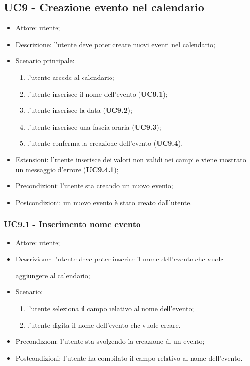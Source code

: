 

\subsection{UC9 - Creazione evento nel calendario}
\begin{itemize}
    \item Attore: utente;
    \item Descrizione: l'utente deve poter creare nuovi eventi nel calendario;
    \item Scenario principale:
        \begin{enumerate}
        \item l'utente accede al calendario;
        \item l'utente inserisce il nome dell'evento (\textbf{UC9.1});
        \item l'utente inserisce la data (\textbf{UC9.2});
        \item l'utente inserisce una fascia oraria (\textbf{UC9.3});
        \item l'utente conferma la creazione dell'evento (\textbf{UC9.4}).
        \end{enumerate}
    \item Estensioni: l'utente inserisce dei valori non validi nei campi e viene mostrato un messaggio d'errore (\textbf{UC9.4.1});
    \item Precondizioni: l'utente sta creando un nuovo evento;
    \item Postcondizioni: un nuovo evento è stato creato dall'utente.
\end{itemize}

\subsubsection{UC9.1 - Inserimento nome evento}
\begin{itemize}
    \item Attore: utente;
    \item Descrizione: l'utente deve poter inserire il nome dell'evento che vuole \par aggiungere al calendario;
    \item Scenario:
        \begin{enumerate}
        \item l'utente seleziona il campo relativo al nome dell'evento;
        \item l'utente digita il nome dell'evento che vuole creare.
        \end{enumerate}
    
    \item Precondizioni: l'utente sta svolgendo la creazione di un evento;
    \item Postcondizioni: l'utente ha compilato il campo relativo al nome dell'evento.
\end{itemize}


